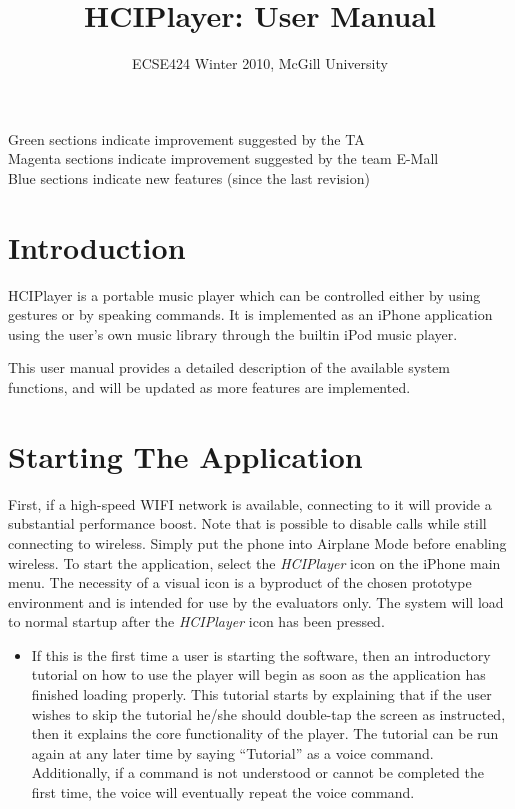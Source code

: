 \documentclass[12pt,letterpaper]{article}
\begin{document}
\title{HCIPlayer: User Manual}
\author{ECSE424 Winter 2010, McGill University}
\renewcommand{\today}{Updated: Wednesday, March 24th, 2010}
\maketitle

\begin{center}
{\color{OliveGreen} Green} sections indicate improvement suggested by the TA \\
{\color{magenta} Magenta} sections indicate improvement suggested by the team E-Mall \\
{\color{blue} Blue} sections indicate new features (since the last revision)
\end{center}

\section{Introduction}

HCIPlayer is a portable music player which can be controlled either by using gestures or by speaking commands. It is implemented as an iPhone application using the user's own music library through the builtin iPod music player.

This user manual provides a detailed description of the available system functions, and will be updated as more features are implemented.

\section{Starting The Application}

First, if a high-speed WIFI network is available, connecting to it will provide a substantial performance boost. {\color{blue} Note that is possible to disable calls while still connecting to wireless. Simply put the phone into Airplane Mode before enabling wireless.} To start the application, select the \emph{HCIPlayer} icon on the iPhone main menu. The necessity of a visual icon is a byproduct of the chosen prototype environment and is intended for use by the evaluators only. The system will load to normal startup after the \emph{HCIPlayer} icon has been pressed.

\begin{itemize}
\item If this is the first time a user is starting the software, then an introductory tutorial on how to use the player will begin as soon as the application has finished loading properly. This tutorial starts by explaining that if the user wishes to skip the tutorial he/she should double-tap the screen as instructed, then it explains the core functionality of the player. The tutorial can be run again at any later time by saying ``Tutorial'' as a voice command. {\color{blue} Additionally, if a command is not understood or cannot be completed the first time, the voice will eventually repeat the voice command.}
\end{itemize}
\end{document}

